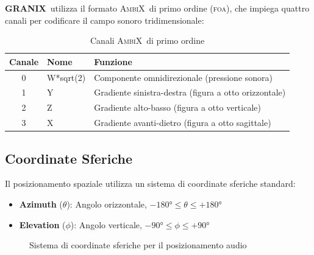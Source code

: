 \documentclass[a4paper,11pt,openany]{book}
\newcommand{\granix}{\textbf{\textcolor{granixblue}{GRANIX}}}
\newcommand{\foa}{\textsc{foa}}
\newcommand{\ambix}{\textsc{AmbiX}}
\begin{document}
\granix\ utilizza il formato \ambix\ di primo ordine (\foa), che impiega quattro canali per codificare il campo sonoro tridimensionale:

\begin{table}[H]
    \centering
    \caption{Canali \ambix\ di primo ordine}
    \label{tab:ambix_channels}
    \begin{tabular}{@{}clp{6cm}@{}}
        \toprule
        \textbf{Canale} & \textbf{Nome} & \textbf{Funzione} \\
        \midrule
        0 & W*sqrt(2) & Componente omnidirezionale (pressione sonora) \\
        1 & Y & Gradiente sinistra-destra (figura a otto orizzontale) \\
        2 & Z & Gradiente alto-basso (figura a otto verticale) \\
        3 & X & Gradiente avanti-dietro (figura a otto sagittale) \\
        \bottomrule
    \end{tabular}
\end{table}

\subsection{Coordinate Sferiche}

Il posizionamento spaziale utilizza un sistema di coordinate sferiche standard:

\begin{itemize}
    \item \textbf{Azimuth} ($\theta$): Angolo orizzontale, $-180° \leq \theta \leq +180°$
    \item \textbf{Elevation} ($\phi$): Angolo verticale, $-90° \leq \phi \leq +90°$
\end{itemize}

\begin{figure}[H]
    \centering
    \caption{Sistema di coordinate sferiche per il posizionamento audio}
    \label{fig:spherical_coords}
\end{figure}
\end{document}
